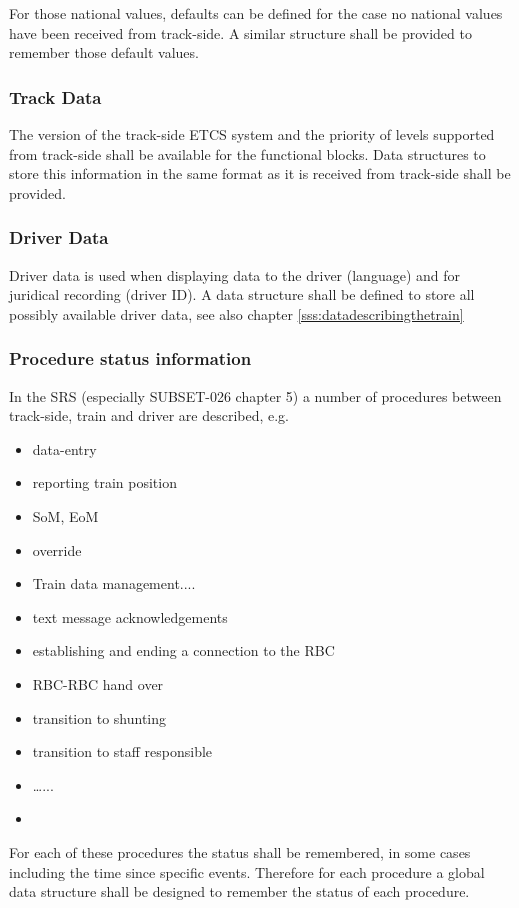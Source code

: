 For those national values, defaults can be defined for the case no national values have been received from track-side. A similar structure shall be provided to remember those default values.


\subsubsection{Track Data}
The version of the track-side ETCS system and the priority of levels supported from track-side shall be available for the functional blocks. Data structures to store this information in the same format as it is received from track-side shall be provided.


\subsubsection{Driver Data}
Driver data is used when displaying data to the driver (language) and for juridical recording (driver ID). A data structure shall be defined to store all possibly available driver data, see also chapter \ref{sss:datadescribingthetrain}


\subsubsection{Procedure status information}
In the SRS (especially SUBSET-026 chapter 5) a number of procedures between track-side, train and driver are described, e.g.
\begin{itemize}
\item data-entry
\item reporting train position
\item SoM, EoM
\item override
\item Train data management....
\item text message acknowledgements
\item establishing and ending a connection to the RBC
\item RBC-RBC hand over
\item transition to shunting
\item transition to staff responsible
\item …...
\item {}
\end{itemize}

For each of these procedures the status shall be remembered, in some cases including the time since specific events.
Therefore for each procedure a global data structure shall be designed to remember the status of each procedure.



